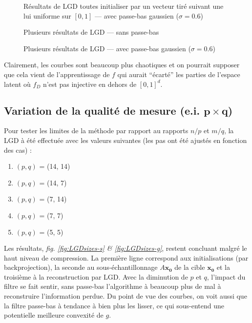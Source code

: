 \documentclass[hidelinks, french]{article} %
\renewcommand{\bf}[1]{\boldsymbol{#1}}
\theoremstyle{enonce}
\theoremstyle{special}
\theoremstyle{rq}
\theoremstyle{exo}
\theoremstyle{demo}
\begin{document}
\begin{figure}[H]\centering
	
	\caption{Résultats de LGD toutes initialiser par un vecteur tiré suivant une lui uniforme sur $[0,1]$ ---  avec passe-bas gaussien ($\sigma=0.6$)}
	\label{fig:LGDunif-g}
\end{figure}
\begin{figure}[H]\centering
	
	\caption{Plusieurs résultats de LGD --- sans passe-bas}
	\label{fig:LGDgauss-s}
\end{figure}
\begin{figure}[H]\centering
	
	\caption{Plusieurs résultats de LGD ---  avec passe-bas gaussien ($\sigma=0.6$)}
	\label{fig:LGDgauss-g}
\end{figure}

\noindent Clairement, les courbes sont beaucoup plus chaotiques et on pourrait supposer que cela vient de l'apprentissage de $f$ qui aurait ``écarté'' les parties de l'espace latent où $f_D$ n'est pas injective en dehors de $[0,1]^d$.


\subsection{Variation de la qualité de mesure (e.i. $\bf{p}\times\bf{q}$)}\label{sec:LGDsize}

Pour tester les limites de la méthode par rapport au rapports $n/p$ et $m/q$, la LGD à été effectuée avec les valeurs suivantes (les pas ont été ajustés en fonction des cas) :
\begin{enumerate}[label=(\arabic*)]
	\item $(p,q)$ = (14, 14)
	\item $(p,q)$ = (14, 7)
	\item $(p,q)$ = (7, 14)
	\item $(p,q)$ = (7, 7)
	\item $(p,q)$ = (5, 5)
\end{enumerate}

Les résultats, \textit{fig. \ref{fig:LGDsizes-s} \& \ref{fig:LGDsizes-g}}, restent concluant malgré le haut niveau de compression. La première ligne correspond aux initialisations (par backprojection), la seconde au sous-échantillonnage $A\bf{x_0}$ de la cible $\bf{x_0}$ et la troisième à la reconstruction par LGD. Avec la diminution de $p$ et $q$, l'impact du filtre se fait sentir, sans passe-bas l'algorithme à beaucoup plus de mal à reconstruire l'information perdue. Du point de vue des courbes, on voit aussi que la filtre passe-bas à tendance à bien plus les lisser, ce qui sous-entend une potentielle meilleure convexité de $g$.
\end{document}
